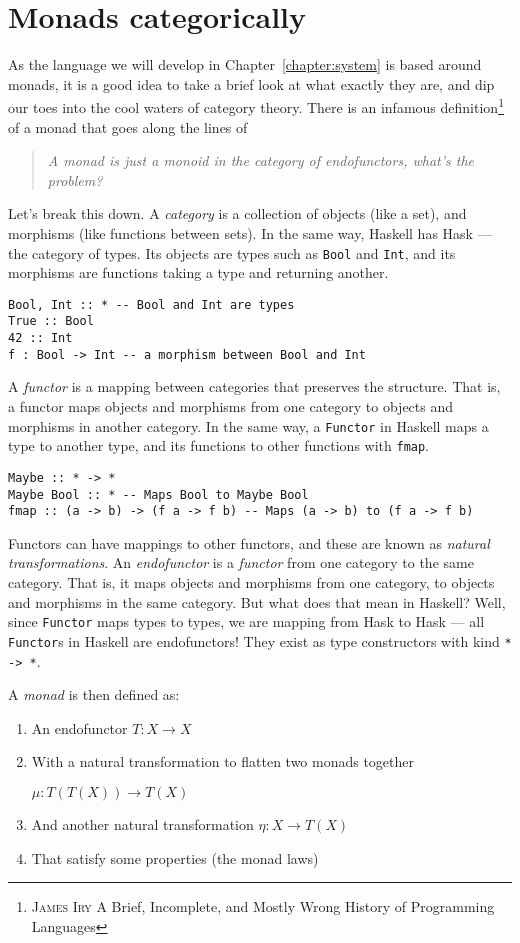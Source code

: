 \section{Monads categorically}
As the language we will develop in Chapter~\ref{chapter:system} is
based around monads, it is a good idea to take a brief look at what
exactly they are, and dip our toes into the cool waters of category
theory. There is an infamous definition\footnote{\textsc{James Iry} A
  Brief, Incomplete, and Mostly Wrong History of Programming
  Languages} of a monad that goes along the lines of
\begin{quote}
  \textsl{A monad is just a monoid in the category of endofunctors,
    what's the problem?}
\end{quote}
Let's break this down. A \textit{category} is a collection of objects
(like a set), and morphisms (like functions between sets). In the same
way, Haskell has \textsf{Hask} --- the category of types. Its objects
are types such as \texttt{Bool} and
\texttt{Int}, and its morphisms are functions taking a
type and returning another.
\begin{verbatim}
Bool, Int :: * -- Bool and Int are types
True :: Bool
42 :: Int
f : Bool -> Int -- a morphism between Bool and Int
\end{verbatim}
A \textit{functor} is a mapping between categories that
preserves the structure. That is, a functor maps objects and morphisms
from one category to objects and morphisms in another category.
In the same way, a \texttt{Functor} in Haskell maps a
type to another type, and its functions to other functions with
\texttt{fmap}. 
\begin{verbatim}
Maybe :: * -> *
Maybe Bool :: * -- Maps Bool to Maybe Bool
fmap :: (a -> b) -> (f a -> f b) -- Maps (a -> b) to (f a -> f b)
\end{verbatim}
Functors can have mappings to other functors, and these are known as
\emph{natural transformations}.
An \textit{endofunctor} is a \textit{functor} from one category to the
same category. That is, it maps objects and morphisms from one
category, to objects and morphisms in the same category. But what does
that mean in Haskell? Well, since \texttt{Functor} maps
types to types, we are mapping from \textsf{Hask} to \textsf{Hask} ---
all \texttt{Functor}s in Haskell are endofunctors! They
exist as type constructors with kind \texttt{* -> *}.

A \textit{monad} is then defined as:
\begin{enumerate}
\item An endofunctor $T : X \rightarrow X$
\item With a natural transformation to flatten two monads together

${\mu : T(T(X)) \rightarrow T(X)}$
\item And another natural transformation $\eta : X \rightarrow T(X)$
\item That satisfy some properties (the monad laws)
\end{enumerate}

